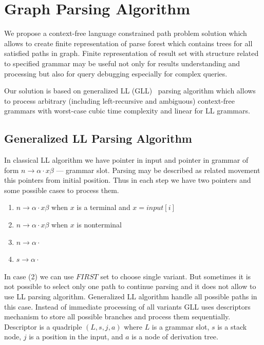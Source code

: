 \section{Graph Parsing Algorithm}

We propose a context-free language constrained path problem solution which allows to create finite representation of parse forest which contains trees for all satisfied paths in graph.
Finite representation of result set with structure related to specified grammar may be useful not only for results understanding and processing but also for query debugging especially for complex queries. 

Our solution is based on generalized LL (GLL)~\cite{scott2010gll, FastPracticalGLL} parsing algorithm which allows to process arbitrary (including left-recursive and ambiguous) context-free grammars with worst-case cubic time complexity and linear for LL grammars. 

\subsection{Generalized LL Parsing Algorithm}

In classical LL algorithm we have pointer in input and pointer in grammar of form $n \rightarrow \alpha \cdot x \beta $ --- grammar slot.
Parsing may be described as related movement this pointers from initial position. Thus in each step we have two pointers and some possible cases to process them. 

\begin{enumerate}
\item $n \rightarrow \alpha \cdot x \beta $ when $x$ is a terminal and $x = input[i]$ 
\item $n \rightarrow \alpha \cdot x \beta $ when $x$ is nonterminal
\item $n \rightarrow \alpha \cdot $
\item $s \rightarrow \alpha \cdot $
\end{enumerate}

In case (2) we can use $FIRST$ set to choose single variant. 
But sometimes it is not possible to select only one path to continue parsing and it does not allow to use LL parsing algorithm.
Generalized LL algorithm handle all possible paths in this case. 
Instead of immediate processing of all variants GLL uses descriptors mechanism to store all possible branches and process them sequentially. 
Descriptor is a quadriple $(L, s, j, a)$ where $L$ is a grammar slot, $s$ is a stack node, $j$ is a position in the input, and $a$ is a node of derivation tree. 

